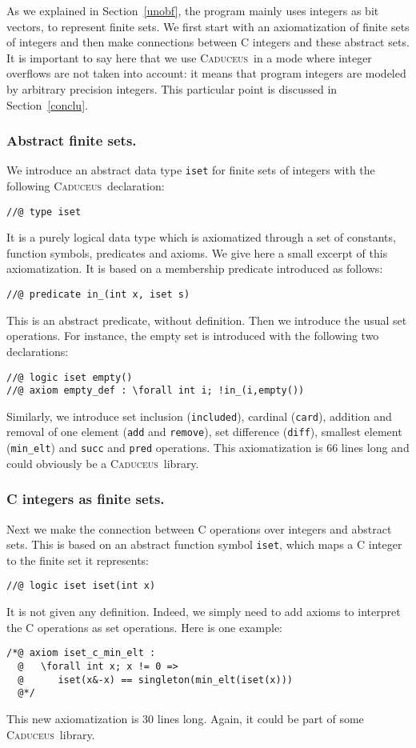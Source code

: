 \documentclass[a4paper]{llncs}
\newcommand{\caduceus}{\textsc{Caduceus}}
\begin{document}
As we explained in Section~\ref{unobf}, the program mainly uses integers
as bit vectors, to represent finite sets.  We first start with an
axiomatization of finite sets of integers and then make connections
between C integers and these abstract sets. It is important to say
here that we use \caduceus\ in a mode where integer overflows are not
taken into account: it means that program integers are modeled by arbitrary
precision integers. This particular point is discussed in
Section~\ref{conclu}. 

\subsubsection{Abstract finite sets.}
We introduce an abstract data type \texttt{iset} for finite sets of
integers with the following \caduceus\ declaration:
\begin{verbatim}
//@ type iset
\end{verbatim}
It is a purely logical data type which is axiomatized through a set of
constants, function symbols, predicates and axioms. We give here a small 
excerpt of this axiomatization. It is based on a
membership predicate  introduced as follows:
\begin{verbatim}
//@ predicate in_(int x, iset s)
\end{verbatim}
This is an abstract predicate, without definition. Then we introduce
the usual set operations. For instance, the empty set is introduced
with the following two declarations:
\begin{verbatim}
//@ logic iset empty()
//@ axiom empty_def : \forall int i; !in_(i,empty())
\end{verbatim}
Similarly, we introduce set inclusion (\texttt{included}), cardinal
(\texttt{card}), addition and removal
of one element (\texttt{add} and 
\texttt{remove}), set difference (\texttt{diff}), smallest element
(\texttt{min\_elt}) and \texttt{succ} and \texttt{pred} operations.
This axiomatization is 66 lines long and could obviously be a 
\caduceus\ library.

\subsubsection{C integers as finite sets.}
Next we make the connection between C operations over integers and
abstract sets. This is based on an abstract function symbol
\texttt{iset}, which maps a C integer to the finite set it represents:
\begin{verbatim}
//@ logic iset iset(int x)
\end{verbatim}
It is not given any definition. Indeed, we simply need to 
add axioms to interpret the C operations as set operations.
Here is one example:
\begin{verbatim}
/*@ axiom iset_c_min_elt :
  @   \forall int x; x != 0 =>
  @      iset(x&-x) == singleton(min_elt(iset(x)))
  @*/
\end{verbatim}
This new axiomatization is 30 lines long. Again, it could be part of some
\caduceus\ library.
\end{document}
